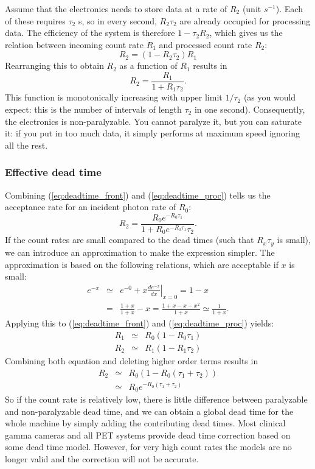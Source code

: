 Assume that the electronics needs to store data at a rate of $R_2$ (unit
$s^{-1}$). Each of these requires $\tau_2$ s, so in every second, $R_2 \tau_2$
are already occupied for processing data. The efficiency of the system is
therefore $1 - \tau_2 R_2$, which gives us the relation between incoming count
rate $R_1$ and processed count rate $R_2$:
\begin{equation}
  R_2 = (1 - R_2 \tau_2) R_1
\end{equation}
Rearranging this to obtain $R_2$ as a function of $R_1$ results in
\begin{equation}
  R_2 = \frac{R_1}{1 + R_1 \tau_2}. \label{eq:deadtime_proc}
\end{equation}
This function is monotonically increasing with upper limit $1 /
\tau_2$ (as you would expect: this is the number of intervals of
length $\tau_2$ in one second).  Consequently, the electronics is
non-paralyzable. You cannot paralyze it, but you can saturate it: if
you put in too much data, it simply performs at maximum speed ignoring
all the rest.

\subsubsection{Effective dead time}
Combining (\ref{eq:deadtime_front}) and (\ref{eq:deadtime_proc}) tells us the
acceptance rate for an incident photon rate of $R_0$:
\begin{equation}
  R_2 = \frac{R_0 e^{-R_0 \tau_1}}{ 1 + R_0 e^{-R_0 \tau_1} \tau_2}.
\end{equation}
If the count rates are small compared to the dead times (such that $R_x
\tau_y$ is small), we can introduce an approximation to make the
expression simpler. The approximation is based on the following relations,
which are acceptable if $x$ is small:
\begin{eqnarray}
  e^{-x} & \simeq & e^{-0} + x \left. \frac{d e^{-x}}{dx} \right|_{x=0}= 1-x\\
         & = & \frac{1+x}{1+x} - x = \frac{1+x-x-x^2}{1+x} 
        \simeq \frac{1}{1 + x}.
\end{eqnarray}
Applying this to (\ref{eq:deadtime_front}) and (\ref{eq:deadtime_proc}) yields:
\begin{eqnarray}
  R_1 & \simeq & R_0 (1 - R_0 \tau_1)\\
  R_2 & \simeq & R_1 (1 - R_1 \tau_2)
\end{eqnarray}
Combining both equation and deleting higher order terms results in
\begin{eqnarray}
  R_2 & \simeq & R_0 \left(1 - R_0 (\tau_1 + \tau_2) \right) \label{eq:dead1}\\
      & \simeq & R_0 e^{- R_0 (\tau_1 + \tau_2)} \label{eq:dead2}
\end{eqnarray}
So if the count rate is relatively low, there is little difference between
paralyzable and non-paralyzable dead time, and we can obtain a global dead
time for the whole machine by simply adding the contributing dead times.  Most
clinical gamma cameras and all PET systems provide dead time correction based
on some dead time model. However, for very high count rates the models are no
longer valid and the correction will not be accurate.

